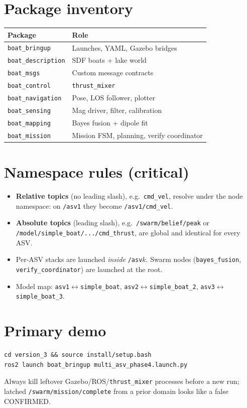 \section{Package inventory}
\begin{center}
\begin{tabular}{@{}lp{9.5cm}@{}}
\toprule
Package & Role \\
\midrule
\texttt{boat\_bringup} & Launches, YAML, Gazebo bridges \\
\texttt{boat\_description} & SDF boats + lake world \\
\texttt{boat\_msgs} & Custom message contracts \\
\texttt{boat\_control} & \texttt{thrust\_mixer} \\
\texttt{boat\_navigation} & Pose, LOS follower, plotter \\
\texttt{boat\_sensing} & Mag driver, filter, calibration \\
\texttt{boat\_mapping} & Bayes fusion + dipole fit \\
\texttt{boat\_mission} & Mission FSM, planning, verify coordinator \\
\bottomrule
\end{tabular}
\end{center}

\section{Namespace rules (critical)}
\begin{itemize}[leftmargin=*]
  \item \textbf{Relative topics} (no leading slash), e.g.\ \texttt{cmd\_vel},
        resolve under the node namespace: on \texttt{/asv1} they become
        \texttt{/asv1/cmd\_vel}.
  \item \textbf{Absolute topics} (leading slash), e.g.\
        \texttt{/swarm/belief/peak} or
        \texttt{/model/simple\_boat/.../cmd\_thrust}, are global and identical
        for every ASV.
  \item Per-ASV stacks are launched \emph{inside} \texttt{/asv\(k\)}. Swarm
        nodes (\texttt{bayes\_fusion}, \texttt{verify\_coordinator}) are
        launched at the root.
  \item Model map: \texttt{asv1}$\leftrightarrow$\texttt{simple\_boat},
        \texttt{asv2}$\leftrightarrow$\texttt{simple\_boat\_2},
        \texttt{asv3}$\leftrightarrow$\texttt{simple\_boat\_3}.
\end{itemize}

\section{Primary demo}
\begin{verbatim}
cd version_3 && source install/setup.bash
ros2 launch boat_bringup multi_asv_phase4.launch.py
\end{verbatim}
Always kill leftover Gazebo/ROS/\texttt{thrust\_mixer} processes before a new
run; latched \texttt{/swarm/mission/complete} from a prior domain looks like a
false CONFIRMED.
